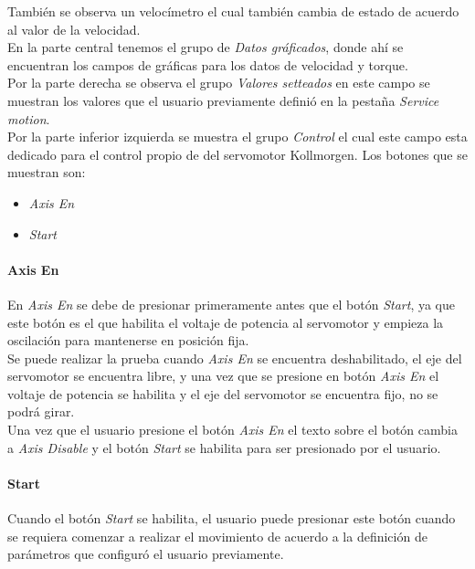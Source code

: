 \documentclass[12pt,titlepage]{article}
\begin{document}
También se observa un velocímetro el cual también cambia de estado de acuerdo al valor de la velocidad. \\

En la parte central tenemos el grupo de \textit{Datos gráficados}, donde ahí se encuentran los campos de gráficas para los datos de velocidad y torque. \\ 

Por la parte derecha se observa el grupo \textit{Valores setteados} en este campo se muestran los valores que el usuario previamente definió en la pestaña \textit{Service motion}. \\ 

\newpage
Por la parte inferior izquierda se muestra el grupo \textit{Control} el cual este campo esta dedicado para el control propio de del servomotor Kollmorgen. Los botones que se muestran son: \\

\begin{itemize}
\item \textit{Axis En}
\item \textit{Start}
\end{itemize}

\paragraph*{Axis En}\leavevmode\newline
En \textit{Axis En} se debe de presionar primeramente antes que el botón \textit{Start}, ya que este botón es el que habilita el voltaje de potencia al servomotor y empieza la oscilación para mantenerse en posición fija. \\

Se puede realizar la prueba cuando \textit{Axis En} se encuentra deshabilitado, el eje del servomotor se encuentra libre, y una vez que se presione en botón \textit{Axis En} el voltaje de potencia se habilita y el eje del servomotor se encuentra fijo, no se podrá girar. \\

Una vez que el usuario presione el botón \textit{Axis En} el texto sobre el botón cambia a \textit{Axis Disable} y el botón \textit{Start} se habilita para ser presionado por el usuario. \\

\paragraph*{Start}\leavevmode\newline
Cuando el botón \textit{Start} se habilita, el usuario puede presionar este  botón cuando se requiera comenzar a realizar el movimiento de acuerdo a la definición de parámetros que configuró el usuario previamente. \\ 
\end{document}
